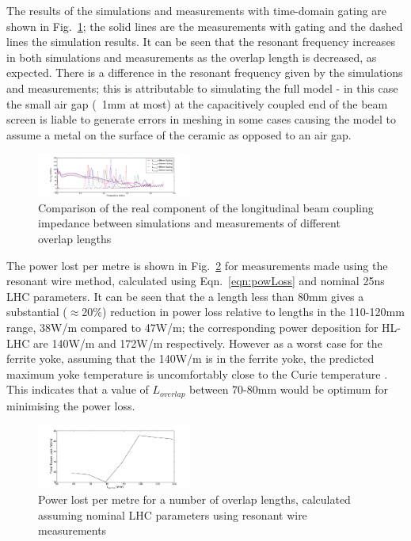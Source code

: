 \documentclass[a4paper,
              ]{jacow}
\begin{document}
The results of the simulations and measurements with time-domain gating are shown in Fig.~\ref{fig:simMeasComp}; the solid lines are the measurements with gating and the dashed lines the simulation results. It can be seen that the resonant frequency increases in both simulations and measurements as the overlap length is decreased, as expected. There is a difference in the resonant frequency given by the simulations and measurements; this is attributable to simulating the full model - in this case the small air gap (~1mm at most) at the capacitively coupled end of the beam screen is liable to generate errors in meshing in some cases causing the model to assume a metal on the surface of the ceramic as opposed to an air gap.

\begin{figure}
\begin{center}
\includegraphics[width=0.45\textwidth]{MOPJE038f5.pdf}
\caption{Comparison of the real component of the longitudinal beam coupling impedance between simulations and measurements of different overlap lengths}
\label{fig:simMeasComp}
\end{center}
\end{figure}

The power lost per metre is shown in Fig.~\ref{fig:powLossTotal} for measurements made using the resonant wire method, calculated using Eqn.~\ref{eqn:powLoss} and nominal 25ns LHC parameters. It can be seen that the a length less than 80mm gives a substantial ($\approx$20\%) reduction in power loss relative to lengths in the 110-120mm range, 38W/m compared to 47W/m; the corresponding power deposition for HL-LHC are 140W/m and 172W/m respectively. However as a worst case for the ferrite yoke, assuming that the 140W/m is in the ferrite yoke, the predicted maximum yoke temperature is uncomfortably close to the Curie temperature \cite{lorenaStrat}. This indicates that a value of $L_{overlap}$ between 70-80mm would be optimum for minimising the power loss.

\begin{figure}
\begin{center}
\includegraphics[width=0.45\textwidth]{MOPJE038f6.pdf}
\caption{Power lost per metre for a number of overlap lengths, calculated assuming nominal LHC parameters using resonant wire measurements}
\label{fig:powLossTotal}
\end{center}
\end{figure}
\end{document}
